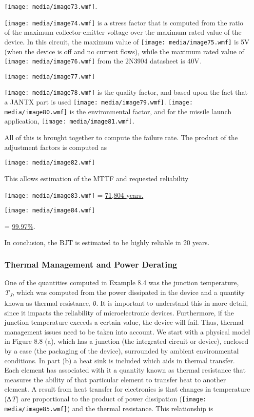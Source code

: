 \texttt{[image: media/image73.wmf]}.

\texttt{[image: media/image74.wmf]} is a stress factor that is computed
from the ratio of the maximum collector-emitter voltage over the maximum
rated value of the device. In this circuit, the maximum value of
\texttt{[image: media/image75.wmf]} is 5V (when the device is off and no
current flows), while the maximum rated value of
\texttt{[image: media/image76.wmf]} from the 2N3904 datasheet is 40V.

\texttt{[image: media/image77.wmf]}

\texttt{[image: media/image78.wmf]} is the quality factor, and based
upon the fact that a JANTX part is used
\texttt{[image: media/image79.wmf]}. \texttt{[image: media/image80.wmf]}
is the environmental factor, and for the missile launch application,
\texttt{[image: media/image81.wmf]}.

All of this is brought together to compute the failure rate. The product
of the adjustment factors is computed as

\texttt{[image: media/image82.wmf]}

This allows estimation of the MTTF and requested reliability

\texttt{[image: media/image83.wmf]} = \ul{71,804 years.}

\texttt{[image: media/image84.wmf]}

= \ul{99.97\%}.

In conclusion, the BJT is estimated to be highly reliable in 20 years.

\subsubsection{Thermal Management and Power
Derating}\label{thermal-management-and-power-derating}

One of the quantities computed in Example 8.4 was the junction
temperature, \emph{T\textsubscript{J}}, which was computed from the
power dissipated in the device and a quantity known as thermal
resistance, \emph{θ}. It is important to understand this in more detail,
since it impacts the reliability of microelectronic devices.
Furthermore, if the junction temperature exceeds a certain value, the
device will fail. Thus, thermal management issues need to be taken into
account. We start with a physical model in Figure 8.8 (a), which has a
junction (the integrated circuit or device), enclosed by a case (the
packaging of the device), surrounded by ambient environmental
conditions. In part (b) a heat sink is included which aids in thermal
transfer. Each element has associated with it a quantity known as
thermal resistance that measures the ability of that particular element
to transfer heat to another element. A result from heat transfer for
electronics is that changes in temperature (∆\emph{T}) are proportional
to the product of power dissipation
(\texttt{[image: media/image85.wmf]}) and the thermal resistance. This
relationship is

